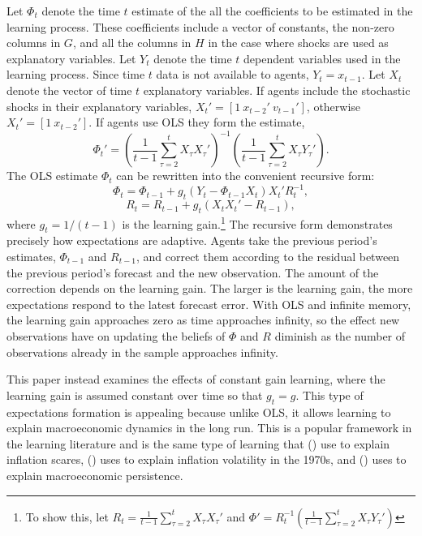 \documentclass[11pt]{article}
\newcommand{\beq}{\begin{equation}}
\newcommand{\eeq}{\end{equation}}
\newcommand{\citee}[1]{\citeauthor*{#1} (\citeyear{#1})}
\begin{document}
Let $\Phi_t$ denote the time $t$ estimate of the all the coefficients to be estimated in the learning process.  These coefficients include a vector of constants, the non-zero columns in $G$, and all the columns in $H$ in the case where shocks are used as explanatory variables.  Let $Y_t$ denote the time $t$ dependent variables used in the learning process.  Since time $t$ data is not available to agents, $Y_t = x_{t-1}$.  Let $X_t$ denote the vector of time $t$ explanatory variables.  If agents include the stochastic shocks in their explanatory variables, $X_t' = [1~ x_{t-2}'~ v_{t-1}']$, otherwise $X_t' = [1~ x_{t-2}']$.  If agents use OLS they form the estimate,
\beq \label{eq1:Phi} \Phi_t' = \left( \frac{1}{t-1} \sum_{\tau=2}^{t} X_{\tau} X_{\tau}' \right)^{-1} \left( \frac{1}{t-1} \sum_{\tau=2}^{t} X_{\tau} Y_{\tau}' \right). \eeq 
The OLS estimate $\Phi_t$ can be rewritten into the convenient recursive form:
\beq \label{eq1:lnPhi} \Phi_t = \Phi_{t-1} + g_t (Y_{t} - \Phi_{t-1} X_{t}) X_{t}' R_t^{-1} ,\eeq
\beq \label{eq1:lnR} R_t = R_{t-1} + g_t (X_{t} X_{t}' - R_{t-1}), \eeq
where $g_t=1/(t-1)$ is the learning gain.\footnote{To show this, let $R_t = \frac{1}{t-1} \sum_{\tau=2}^{t} X_{\tau} X_{\tau}'$ and $\Phi' = R_t^{-1} \left( \frac{1}{t-1} \sum_{\tau=2}^{t} X_{\tau} Y_{\tau}' \right)$}  The recursive form demonstrates precisely how expectations are adaptive.  Agents take the previous period's estimates, $\Phi_{t-1}$ and $R_{t-1}$, and correct them according to the residual between the previous period's forecast and the new observation.  The amount of the correction depends on the learning gain.  The larger is the learning gain, the more expectations respond to the latest forecast error.  With OLS and infinite memory, the learning gain approaches zero as time approaches infinity, so the effect new observations have on updating the beliefs of $\Phi$ and $R$ diminish as the number of observations already in the sample approaches infinity.  

This paper instead examines the effects of constant gain learning, where the learning gain is assumed constant over time so that $g_t = g$.  This type of expectations formation is appealing because unlike OLS, it allows learning to explain macroeconomic dynamics in the long run.  This is a popular framework in the learning literature and is the same type of learning that \citee{ow2005} use to explain inflation scares, \citee{primiceri2006} uses to explain inflation volatility in the 1970s, and \citee{milani2007} uses to explain macroeconomic persistence.
\end{document}
